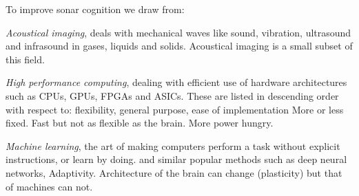 {%


To improve sonar cognition we draw from:

\emph{Acoustical imaging}, deals with mechanical waves like sound, vibration, ultrasound and infrasound in gases, liquids and solids. Acoustical imaging is a small subset of this field.

\emph{High performance computing}, dealing with efficient use of hardware architectures such as CPUs, GPUs, FPGAs and ASICs. These are listed in descending order with respect to: flexibility, general purpose, ease of implementation  More or less fixed. Fast but not as flexible as the brain. More power hungry. 

\emph{Machine learning}, the art of making computers perform a task without explicit instructions, or learn by doing. and similar popular methods such as deep neural networks, Adaptivity. Architecture of the brain can change (plasticity) but that of machines can not. 





}
